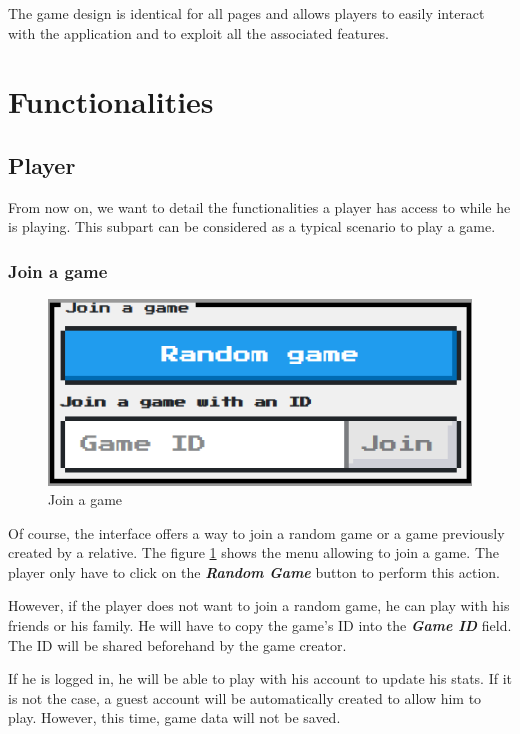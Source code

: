 \documentclass{tnreport}
\begin{document}
The game design is identical for all pages and allows players to easily interact with the application and to exploit all the associated features. 

\section{Functionalities}

\subsection{Player}

From now on, we want to detail the functionalities a player has access to while he is playing. This subpart can be considered as a typical scenario to play a game. 

\subsubsection{Join a game}

\begin{figure}
	\centering
	\vspace*{1cm}
	\includegraphics[scale=0.7]{figures/random_game}
	\caption{Join a game}
	\label{fig:join_game}
\end{figure}

Of course, the interface offers a way to join a random game or a game previously created by a relative. The figure \ref{fig:join_game} shows the menu allowing to join a game. The player only have to click on the \textit{\textbf{Random Game}} button to perform this action. 

However, if the player does not want to join a random game, he can play with his friends or his family. He will have to copy the game's ID into the \textbf{\textit{Game ID}} field. The ID will be shared beforehand by the game creator. 

If he is logged in, he will be able to play with his account to update his stats. If it is not the case, a guest account will be automatically created to allow him to play. However, this time, game data will not be saved. 
\end{document}
